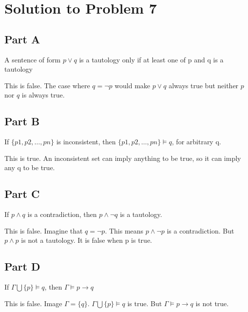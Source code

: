 \documentclass[12pt]{article}
\begin{document}
\section*{Solution to Problem 7}





\subsection*{Part A}
A sentence of form $p \lor q$ is a tautology only if at least one of p and q is a tautology 

This is false. The case where $q = \lnot p$ would make $p \lor q$ always true but neither $p$ nor $q$ is always true. 

\subsection*{Part B}

If $\{p1, p2, …, pn\}$ is inconsistent, then $\{p1, p2, …, pn \} \models q$, for arbitrary q. 

This is true. An inconsistent set can imply anything to be true, so it can imply any q to be true. 

\subsection*{Part C}
If $p \land q$ is a contradiction, then $p \land \lnot q$ is a tautology. 

This is false. Imagine that $q = \lnot p$. This means $p \land \lnot p$ is a contradiction. But $p \land p$ is not a tautology. It is false when p is true. 

\subsection*{Part D}
If $\Gamma \bigcup \{p\} \models q$, then $\Gamma \models p \rightarrow q$ 

This is false. Image $\Gamma = \{ q \}$. $\Gamma \bigcup \{p\} \models q$ is true. But $\Gamma \models p \rightarrow q$ is not true. 
\end{document}
